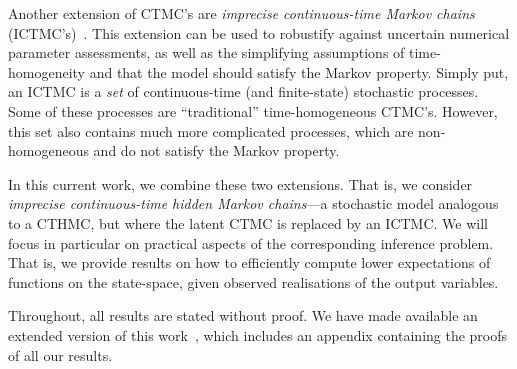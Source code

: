 \documentclass[twoside,11pt]{article}
\begin{document}
Another extension of CTMC's are \emph{imprecise continuous-time Markov chains} (ICTMC's)~\citep{Skulj:2015cq, krak2016ictmc}. This extension can be used to robustify against uncertain numerical parameter assessments, as well as the simplifying assumptions of time-homogeneity and that the model should satisfy the Markov property. Simply put, an ICTMC is a \emph{set} of continuous-time (and finite-state) stochastic processes. Some of these processes are ``traditional'' time-homogeneous CTMC's. However, this set also contains much more complicated processes, which are non-homogeneous and do not satisfy the Markov property.



In this current work, we combine these two extensions. That is, we consider \emph{imprecise continuous-time hidden Markov chains}---a stochastic model analogous to a CTHMC, but where the latent CTMC is replaced by an ICTMC. We will focus in particular on practical aspects of the corresponding inference problem. That is, we provide results on how to efficiently compute lower expectations of functions on the state-space, given observed realisations of the output variables.

Throughout, all results are stated without proof. We have made available an extended version of this work~\citep{krak2017icthmc}, which includes an appendix containing the proofs of all our results.

\end{document}
